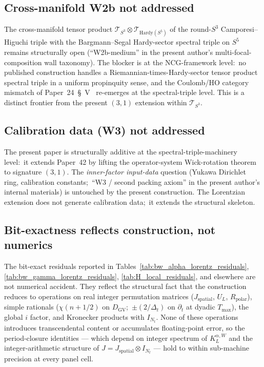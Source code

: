 \documentclass[11pt,a4paper]{article}
\theoremstyle{plain}
\theoremstyle{definition}
\newcommand{\Nt}{N_t}
\newcommand{\sthree}{S^{3}}
\newcommand{\Tcal}{\mathcal{T}}
\newcommand{\DGV}{D_{\mathrm{GV}}}
\newcommand{\KL}{K_{L}}
\begin{document}
\subsection{Cross-manifold W2b not addressed}\label{sec:scope_w2b}

The cross-manifold tensor product
$\Tcal_{\sthree} \otimes \Tcal_{\mathrm{Hardy}(S^5)}$ of the round-$\sthree$
Camporesi--Higuchi triple with the Bargmann--Segal Hardy-sector
spectral triple on $S^5$ remains structurally open
(``W2b-medium'' in the present author's multi-focal-composition wall
taxonomy). The blocker is at the NCG-framework level:\ no published
construction handles a Riemannian-times-Hardy-sector tensor product
spectral triple in a uniform propinquity sense, and the
Coulomb/HO category mismatch of Paper~24~\S~V~\cite{paper24}
re-emerges at the spectral-triple level. This is a distinct
frontier from the present $(3, 1)$ extension within $\Tcal_{\sthree}$.

\subsection{Calibration data (W3) not addressed}\label{sec:scope_w3}

The present paper is structurally additive at the
spectral-triple-machinery level:\ it extends Paper~42 by lifting the
operator-system Wick-rotation theorem to signature $(3, 1)$. The
\emph{inner-factor input-data} question (Yukawa Dirichlet ring,
calibration constants;\ ``W3 / second packing axiom'' in the present
author's internal materials) is untouched by the present construction.
The Lorentzian extension does not generate calibration data;\ it
extends the structural skeleton.

\subsection{Bit-exactness reflects construction, not numerics}
\label{sec:scope_bit_exact}

The bit-exact residuals reported in
Tables~\ref{tab:bw_alpha_lorentz_residuals},
\ref{tab:bw_gamma_lorentz_residuals},
\ref{tab:H_local_residuals}, and elsewhere are not numerical accident.
They reflect the structural fact that the construction reduces to
operations on real integer permutation matrices ($J_{\mathrm{spatial}}$,
$U_L$, $R_{\mathrm{polar}}$), simple rationals ($\chi(n + 1/2)$ on
$\DGV$;\ $\pm (2/\Delta_t)$ on $\partial_t$ at dyadic $T_{\max}$), the
global $i$ factor, and Kronecker products with $I_{\Nt}$. None of
these operations introduces transcendental content or accumulates
floating-point error, so the period-closure identities — which depend
on integer spectrum of $\KL^{\alpha, W}$ and the integer-arithmetic
structure of $J = J_{\mathrm{spatial}} \otimes I_{\Nt}$ — hold to within
sub-machine precision at every panel cell.
\end{document}
